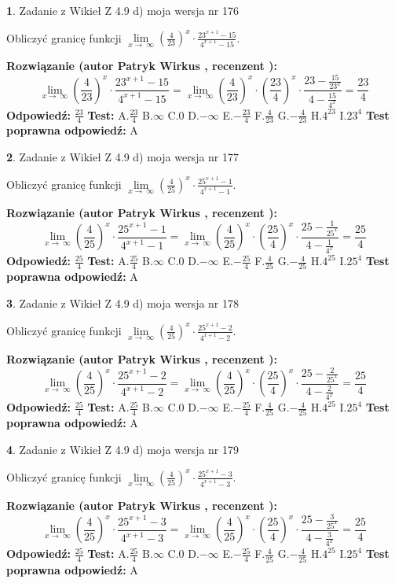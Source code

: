 \documentclass[12pt, a4paper]{article}
\theoremstyle{definition} %
\newtheorem{zad}{}
\newcommand{\zadStart}[1]{\begin{zad}#1\newline}
\newcommand{\zadStop}{\end{zad}}
\newcommand{\rozwStart}[2]{\noindent \textbf{Rozwiązanie (autor #1 , recenzent #2): }\newline}
\newcommand{\rozwStop}{\newline}
\newcommand{\odpStart}{\noindent \textbf{Odpowiedź:}\newline}
\newcommand{\odpStop}{\newline}
\newcommand{\testStart}{\noindent \textbf{Test:}\newline}
\newcommand{\testStop}{\newline}
\newcommand{\kluczStart}{\noindent \textbf{Test poprawna odpowiedź:}\newline}
\newcommand{\kluczStop}{\newline}
\begin{document}
\zadStart{Zadanie z Wikieł Z 4.9 d) moja wersja nr 176}


Obliczyć granicę funkcji  $\lim\limits_{x\to\ \infty}(\frac{4}{23})^{x}\cdot\frac{23^{x+1}-15}{4^{x+1}-15}$.
\zadStop
\rozwStart{Patryk Wirkus}{}
$$\lim\limits_{x\to\ \infty}(\frac{4}{23})^{x}\cdot\frac{23^{x+1}-15}{4^{x+1}-15}=\lim\limits_{x\to\ \infty}(\frac{4}{23})^{x}\cdot(\frac{23}{4})^{x} \cdot \frac{23-\frac{15}{23^{x}}}{4-\frac{15}{4^{x}}} = \frac{23}{4}$$
\rozwStop
\odpStart
$\frac{23}{4}$
\odpStop
\testStart
A.$\frac{23}{4}$ B.$\infty$ C.$0$ D.$-\infty$ E.$-\frac{23}{4}$
F.$\frac{4}{23}$ G.$-\frac{4}{23}$
H.$4^{23}$
I.$23^{4}$
\testStop
\kluczStart
A
\kluczStop



\zadStart{Zadanie z Wikieł Z 4.9 d) moja wersja nr 177}


Obliczyć granicę funkcji  $\lim\limits_{x\to\ \infty}(\frac{4}{25})^{x}\cdot\frac{25^{x+1}-1}{4^{x+1}-1}$.
\zadStop
\rozwStart{Patryk Wirkus}{}
$$\lim\limits_{x\to\ \infty}(\frac{4}{25})^{x}\cdot\frac{25^{x+1}-1}{4^{x+1}-1}=\lim\limits_{x\to\ \infty}(\frac{4}{25})^{x}\cdot(\frac{25}{4})^{x} \cdot \frac{25-\frac{1}{25^{x}}}{4-\frac{1}{4^{x}}} = \frac{25}{4}$$
\rozwStop
\odpStart
$\frac{25}{4}$
\odpStop
\testStart
A.$\frac{25}{4}$ B.$\infty$ C.$0$ D.$-\infty$ E.$-\frac{25}{4}$
F.$\frac{4}{25}$ G.$-\frac{4}{25}$
H.$4^{25}$
I.$25^{4}$
\testStop
\kluczStart
A
\kluczStop



\zadStart{Zadanie z Wikieł Z 4.9 d) moja wersja nr 178}


Obliczyć granicę funkcji  $\lim\limits_{x\to\ \infty}(\frac{4}{25})^{x}\cdot\frac{25^{x+1}-2}{4^{x+1}-2}$.
\zadStop
\rozwStart{Patryk Wirkus}{}
$$\lim\limits_{x\to\ \infty}(\frac{4}{25})^{x}\cdot\frac{25^{x+1}-2}{4^{x+1}-2}=\lim\limits_{x\to\ \infty}(\frac{4}{25})^{x}\cdot(\frac{25}{4})^{x} \cdot \frac{25-\frac{2}{25^{x}}}{4-\frac{2}{4^{x}}} = \frac{25}{4}$$
\rozwStop
\odpStart
$\frac{25}{4}$
\odpStop
\testStart
A.$\frac{25}{4}$ B.$\infty$ C.$0$ D.$-\infty$ E.$-\frac{25}{4}$
F.$\frac{4}{25}$ G.$-\frac{4}{25}$
H.$4^{25}$
I.$25^{4}$
\testStop
\kluczStart
A
\kluczStop



\zadStart{Zadanie z Wikieł Z 4.9 d) moja wersja nr 179}


Obliczyć granicę funkcji  $\lim\limits_{x\to\ \infty}(\frac{4}{25})^{x}\cdot\frac{25^{x+1}-3}{4^{x+1}-3}$.
\zadStop
\rozwStart{Patryk Wirkus}{}
$$\lim\limits_{x\to\ \infty}(\frac{4}{25})^{x}\cdot\frac{25^{x+1}-3}{4^{x+1}-3}=\lim\limits_{x\to\ \infty}(\frac{4}{25})^{x}\cdot(\frac{25}{4})^{x} \cdot \frac{25-\frac{3}{25^{x}}}{4-\frac{3}{4^{x}}} = \frac{25}{4}$$
\rozwStop
\odpStart
$\frac{25}{4}$
\odpStop
\testStart
A.$\frac{25}{4}$ B.$\infty$ C.$0$ D.$-\infty$ E.$-\frac{25}{4}$
F.$\frac{4}{25}$ G.$-\frac{4}{25}$
H.$4^{25}$
I.$25^{4}$
\testStop
\kluczStart
A
\kluczStop
\end{document}
